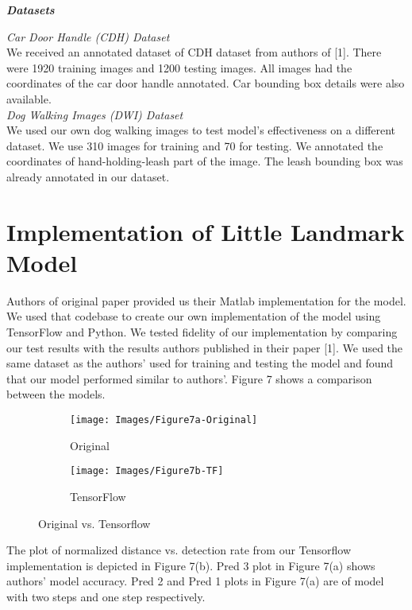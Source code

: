 \documentclass [11pt,letterpaper ,twoside ,openany ]{report}
\begin{document}
    \noindent
    \textbf{\textit{Datasets}}

    \noindent
    \textit{Car Door Handle (CDH) Dataset}\\
    We received an annotated dataset of CDH dataset from authors of [1]. There were 1920 training images and 1200 testing images. All images had the coordinates of the car door handle annotated. Car bounding box details were also available.\\

    \noindent
    \textit{Dog Walking Images (DWI) Dataset}\\
    We used our own dog walking images to test model's effectiveness on a different dataset. We use 310 images for training and 70 for testing. We annotated the coordinates of hand-holding-leash part of the image. The leash bounding box was already annotated in our dataset.

    \chapter{Implementation of Little Landmark Model}
    \doublespacing
    Authors of original paper provided us their Matlab implementation for the model. We used that codebase to create our own implementation of the model using TensorFlow\textsuperscript{\textregistered} and Python. We tested fidelity of our implementation by comparing our test results with the results authors published in their paper [1]. We used the same dataset as the authors' used for training and testing the model and found that our model performed similar to authors'. Figure 7 shows a comparison between the models. \\

    \begin{figure}[h!]
    \centering
        \begin{subfigure}[b]{0.49\linewidth}
            \texttt{[image: Images/Figure7a-Original]}
            \caption{Original}
        \end{subfigure}
        \begin{subfigure}[b]{0.49\linewidth}
            \texttt{[image: Images/Figure7b-TF]}
            \caption{TensorFlow}
        \end{subfigure}
        \caption{Original vs. Tensorflow}
        \label{fig:coffee}
    \end{figure}

    The plot of normalized distance vs. detection rate from our Tensorflow implementation is depicted in Figure 7(b). Pred 3 plot in Figure 7(a) shows authors' model accuracy. Pred 2 and Pred 1 plots in Figure 7(a) are of model with two steps and one step respectively.\\\\
\end{document}
